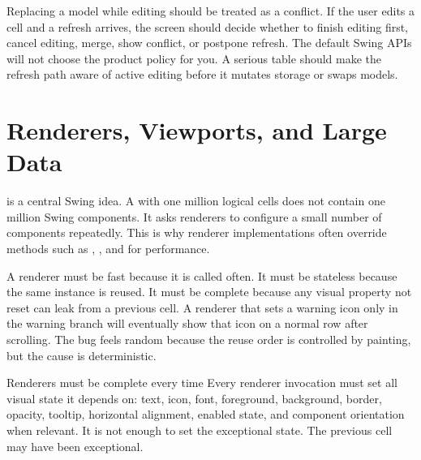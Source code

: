 Replacing a model while editing should be treated as a conflict. If the user edits a cell and a refresh arrives, the screen should decide whether to finish editing first, cancel editing, merge, show conflict, or postpone refresh. The default Swing APIs will not choose the product policy for you. A serious table should make the refresh path aware of active editing before it mutates storage or swaps models.

\section{Renderers, Viewports, and Large Data}

 is a central Swing idea. A  with one million logical cells does not contain one million Swing components. It asks renderers to configure a small number of components repeatedly. This is why renderer implementations often override methods such as , , and  for performance.

A renderer must be fast because it is called often. It must be stateless because the same instance is reused. It must be complete because any visual property not reset can leak from a previous cell. A renderer that sets a warning icon only in the warning branch will eventually show that icon on a normal row after scrolling. The bug feels random because the reuse order is controlled by painting, but the cause is deterministic.

\begin{detailbox}{Renderers must be complete every time}
Every renderer invocation must set all visual state it depends on: text, icon, font, foreground, background, border, opacity, tooltip, horizontal alignment, enabled state, and component orientation when relevant. It is not enough to set the exceptional state. The previous cell may have been exceptional.
\end{detailbox}

